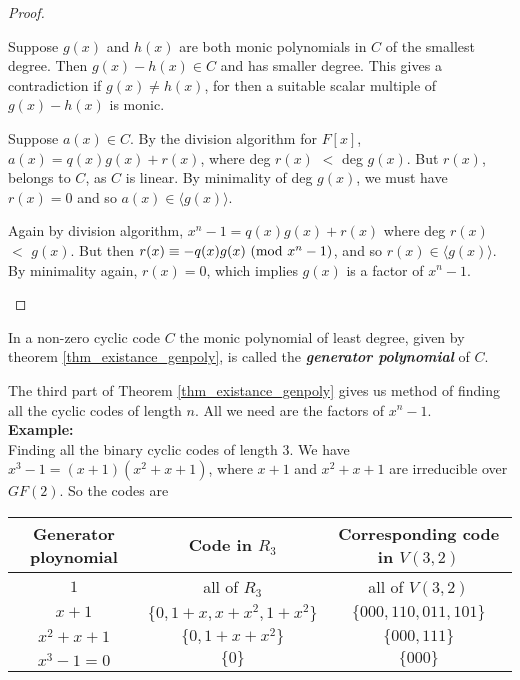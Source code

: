 \documentclass[../main.tex]{subfiles}
\newcommand{\poly}[1]{$#1(x)$}
\newcommand{\cyc}[1]{\langle #1(x) \rangle}
\begin{document}
\begin{proof}
	\begin{enumerate*}[label=(\roman*), before=\unskip{}]
	\item Suppose $g(x)$ and $h(x)$ are both monic polynomials in $C$ of the smallest degree. Then $g(x)-h(x) \in C$ and has smaller degree. This gives a contradiction if $g(x) \neq h(x)$, for then a suitable scalar multiple of $g(x)-h(x)$ is monic.\\
	
	\item Suppose $a(x) \in C$. By the division algorithm for $F[x]$, $a(x)=q(x)g(x) + r(x)$, where deg \poly{r} $<$ deg \poly{g}. But $r(x)$, belongs to $C$, as $C$ is linear. By minimality of deg \poly{g}, we must have $r(x)=0$ and so $a(x) \in \cyc{g}$.\\
	
	\item Again by division algorithm, 
	$
		x^n - 1 = q(x)g(x) + r(x) 
	$ 
	where deg \poly{r} $<$ \poly{g}. But then $r(x) \equiv -q(x)g(x) \ (\mathrm{mod}\ x^n-1)$, and so $r(x) \in \cyc{g}$. By minimality again, $r(x)=0$, which implies $g(x)$ is a factor of $x^n-1$.	
	\end{enumerate*}
\end{proof} 

\begin{defn}
	In a non-zero cyclic code $C$ the monic polynomial of least degree, given by theorem \ref{thm_existance_genpoly}, is called the \textbf{\emph{generator polynomial}} of $C$.
\end{defn}

The third part of Theorem \ref{thm_existance_genpoly} gives us method of finding all the cyclic codes of length $n$. All we need are the factors of $x^n-1$.\\

\textbf{Example:}\\
Finding all the binary cyclic codes of length $3$. We have $x^3-1 = (x+1)(x^2+x+1)$, where $x+1$ and $x^2+x+1$ are irreducible over $GF(2)$. So the codes are
\begin{center}
\begin{tabular}{|c|c|c|}
\hline
Generator ploynomial & Code in $R_3$ & Corresponding code in $V(3,2)$ \\
\hline
$1$ & all of $R_3$ & all of $V(3,2)$ \\
$x+1$ & $\{ 0, 1+x, x + x^2, 1 + x^2 \}$ & $\{ 000, 110, 011, 101 \}$ \\
$x^2+x+1$ & $\{ 0, 1 + x+ x^2 \}$ & $\{ 000, 111 \}$ \\
$x^3-1 = 0$ & $\{ 0 \}$ & $\{ 000 \}$ \\
\hline
\end{tabular}
\end{center}
\end{document}
